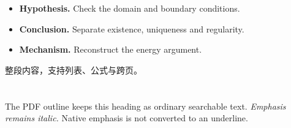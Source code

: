 \expandafter\documentclass\expandafter[\AnnotationOptions]{lumenbook}
\begin{document}
\begin{markblock}
\begin{itemize}
  \item \textbf{Hypothesis.} Check the domain and boundary conditions.
  \item \textbf{Conclusion.} Separate existence, uniqueness and regularity.
  \item \textbf{Mechanism.} Reconstruct the energy argument.
\end{itemize}
\end{markblock}
\begin{codeblock}[language=LaTeX,title={A compact interface}]
\begin{markblock}[LumenMarkBlue][标题可省略]
整段内容，支持列表、公式与跨页。
\end{markblock}
\end{codeblock}
\section{}
The PDF outline keeps this heading as ordinary searchable text.
\emph{Emphasis remains italic.} Native emphasis is not converted to an underline.
\end{document}
